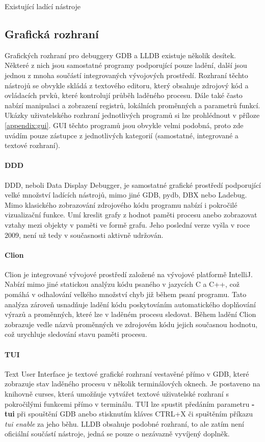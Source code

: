 \documentclass[czech,bachelor,male,python,dept460,hidelinks]{diploma}						%
\begin{document}
\begin{section}{Existující ladící nástroje}
	\subsection{Grafická rozhraní}
		Grafických rozhraní pro debuggery GDB a LLDB existuje několik desítek. Některé z nich jsou samostatné programy podporující pouze ladění, další jsou
		jednou z mnoha součástí integrovaných vývojových prostředí. Rozhraní těchto nástrojů se obvykle skládá z textového editoru, který obsahuje zdrojový kód a
		ovládacích prvků, které kontrolují průběh laděného procesu. Dále také často nabízí manipulaci a zobrazení registrů, lokálních proměnných a parametrů
		funkcí. Ukázky uživatelského rozhraní jednotlivých programů si lze prohlédnout v příloze \ref{appendix:gui}. GUI těchto programů jsou obvykle velmi
		podobná, proto zde uvádím pouze zástupce z jednotlivých kategorií (samostatné, integrované a textové rozhraní).

		\paragraph*{DDD}
			DDD, neboli Data Display Debugger, je samostatné grafické prostředí podporující velké množství ladících nástrojů, mimo jiné GDB, pydb, DBX nebo Ladebug.
			Mimo klasického zobrazování zdrojového kódu programu nabízí i pokročilé vizualizační funkce. Umí kreslit grafy z hodnot paměti procesu
			anebo zobrazovat vztahy mezi objekty v paměti ve formě grafu. Jeho poslední verze vyšla v roce 2009, není už tedy v současnosti aktivně udržován.
		\paragraph*{Clion}
		\label{ref:clion}
			Clion je integrované vývojové prostředí založené na vývojové platformě IntelliJ. Nabízí mimo jiné statickou analýzu kódu psaného v jazycích
			C a C++, což pomáhá v odhalování velkého množství chyb již během psaní programu. Tato analýza zároveň usnadňuje ladění kódu poskytováním
			automatického doplňování výrazů a proměnných, které lze v laděném procesu sledovat. Během ladění Clion zobrazuje vedle názvů proměnných
			ve zdrojovém kódu jejich současnou hodnotu, což urychluje sledování stavu paměti procesu.
		\paragraph*{TUI}
			Text User Interface je textové grafické rozhraní vestavěné přímo v GDB, které zobrazuje stav laděného procesu v několik terminálových oknech.
			Je postaveno na knihovně curses, která umožňuje vytvářet textové uživatelské rozhraní s pokročilými funkcemi přímo v terminálu.
			TUI lze spustit předáním parametru \textbf{-tui} při spouštění GDB anebo stisknutím kláves CTRL+X či spuštěním příkazu \emph{tui enable} za jeho běhu.
			LLDB obsahuje podobné rozhraní, to ale zatím není oficiální součástí nástroje, jedná se pouze o nezávazně vyvíjený doplněk.
\end{section}
\end{document}
